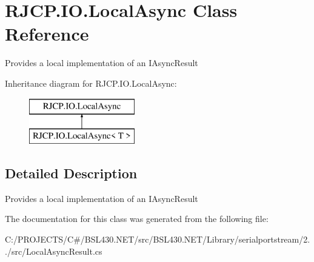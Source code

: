 \hypertarget{class_r_j_c_p_1_1_i_o_1_1_local_async}{}\section{R\+J\+C\+P.\+I\+O.\+Local\+Async Class Reference}
\label{class_r_j_c_p_1_1_i_o_1_1_local_async}


Provides a local implementation of an I\+Async\+Result  


Inheritance diagram for R\+J\+C\+P.\+I\+O.\+Local\+Async\+:\begin{figure}[H]
\begin{center}
\leavevmode
\includegraphics[height=2.000000cm]{class_r_j_c_p_1_1_i_o_1_1_local_async}
\end{center}
\end{figure}


\subsection{Detailed Description}
Provides a local implementation of an I\+Async\+Result 



The documentation for this class was generated from the following file\+:\begin{DoxyCompactItemize}
\item 
C\+:/\+P\+R\+O\+J\+E\+C\+T\+S/\+C\#/\+B\+S\+L430.\+N\+E\+T/src/\+B\+S\+L430.\+N\+E\+T/\+Library/serialportstream/2../src/Local\+Async\+Result.\+cs\end{DoxyCompactItemize}

